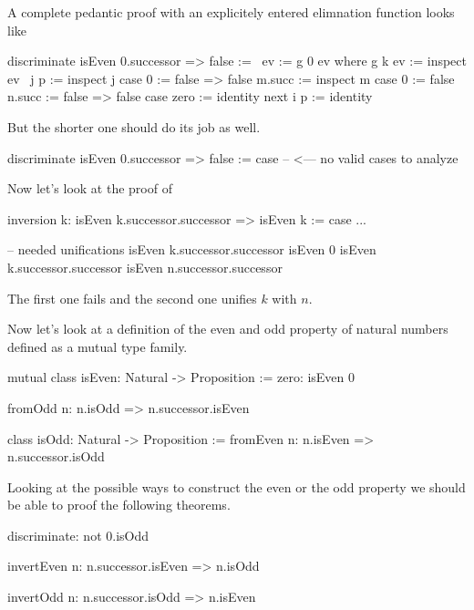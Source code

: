 A complete pedantic proof with an explicitely entered elimnation function looks
like
\begin{alba}
    discriminate isEven 0.successor => false :=
        \ ev := g 0 ev where
            g k ev :=
                inspect
                    ev
                    \ j p := inspect j case
                        0 := false => false
                        m.succ :=
                            inspect m case
                                0 := false
                                n.succ := false => false
                case
                    zero :=
                        identity
                    next i p :=
                        identity
\end{alba}
But the shorter one should do its job as well.
\begin{alba}
    discriminate isEven 0.successor => false :=
        case --  <--- no valid cases to analyze
\end{alba}

\vskip 5mm
Now let's look at the proof of

\begin{alba}
    inversion k: isEven k.successor.successor => isEven k :=
        case ...

    -- needed unifications
    isEven k.successor.successor        isEven 0
    isEven k.successor.successor        isEven n.successor.successor
\end{alba}
The first one fails and the second one unifies $k$ with $n$.




\vskip 5mm
Now let's look at a definition of the even and odd property of natural numbers
defined as a mutual type family.
%
\begin{alba}
    mutual
        class
            isEven: Natural -> Proposition
        :=
            zero: isEven 0

            fromOdd n: n.isOdd => n.successor.isEven

        class
            isOdd: Natural -> Proposition
        :=
            fromEven n: n.isEven => n.successor.isOdd
\end{alba}
%
Looking at the possible ways to construct the even or the odd property we should
be able to proof the following theorems.
%
\begin{alba}
    discriminate: not 0.isOdd

    invertEven n: n.successor.isEven => n.isOdd

    invertOdd  n: n.successor.isOdd  => n.isEven
\end{alba}


